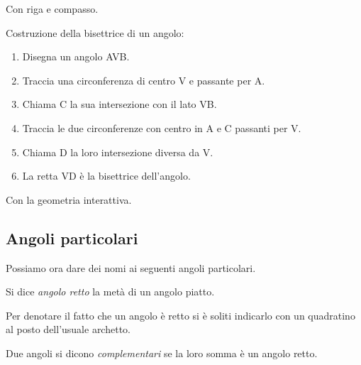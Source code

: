 Con riga e compasso.

\begin{procedura}[Bisettrice]\label{proc:fonda_bisettrice}
  Costruzione della bisettrice di un angolo:
  \begin{enumerate} [nosep]
    \item 
    Disegna un angolo AVB.
    \item 
    Traccia una circonferenza di centro V e passante per A. 
    \item
    Chiama C la sua intersezione con il lato VB.
    \item 
    Traccia le due circonferenze con centro in A e C passanti per V.
    \item 
    Chiama D la loro intersezione diversa da V.    
    \item
    La retta VD è la bisettrice dell'angolo.
  \end{enumerate}
\end{procedura}

\ifcoding
Con la geometria interattiva.


\fi

\subsection{Angoli particolari}

Possiamo ora dare dei nomi ai seguenti angoli particolari.

\begin{definizione}
Si dice \emph{angolo retto} la metà di un angolo piatto.
\end{definizione}

Per denotare il fatto che un angolo è retto si è soliti indicarlo con 
un quadratino al posto dell'usuale archetto.


\begin{inaccessibleblock}
 \begin{figure}[htb]
\centering
\end{figure}
\end{inaccessibleblock}

\begin{definizione}
Due angoli si dicono \emph{complementari} se la loro somma è un 
angolo retto.
\end{definizione}


\begin{inaccessibleblock}
 \begin{figure}[htb]
\centering
\end{figure}
\end{inaccessibleblock}

